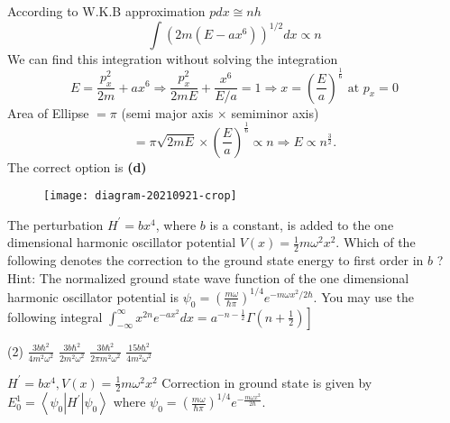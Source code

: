 \begin{enumerate}
\begin{answer}
\begin{minipage}{0.5\textwidth}
		According to W.K.B approximation $p d x \cong n h$
		$$
		\int\left(2 m\left(E-a x^{6}\right)\right)^{1 / 2} d x \propto n
		$$
		We can find this integration without solving the integration
		$$
		E=\frac{p_{x}^{2}}{2 m}+a x^{6} \Rightarrow \frac{p_{x}^{2}}{2 m E}+\frac{x^{6}}{E / a}=1 \Rightarrow x=\left(\frac{E}{a}\right)^{\frac{1}{6}} \text { at } p_{x}=0
		$$
		Area of Ellipse $=\pi$ (semi major axis $\times$ semiminor axis)
		$$
		=\pi \sqrt{2 m E} \times\left(\frac{E}{a}\right)^{\frac{1}{6}} \propto n \Rightarrow E \propto n^{\frac{3}{2}} .
		$$
		The correct option is \textbf{(d)}
	\end{minipage}
	\begin{minipage}{0.5\textwidth}
		\begin{figure}[H]
			\centering
			\texttt{[image: diagram-20210921-crop]}
		\end{figure}
	\end{minipage}
\end{answer}
\begin{minipage}{\textwidth}
	\item The perturbation $H^{\prime}=b x^{4}$, where $b$ is a constant, is added to the one dimensional harmonic oscillator potential $V(x)=\frac{1}{2} m \omega^{2} x^{2}$. Which of the following denotes the correction to the ground state energy to first order in $b$ ?
	Hint: The normalized ground state wave function of the one dimensional harmonic oscillator potential is $\psi_{0}=\left(\frac{m \omega}{\hbar \pi}\right)^{1 / 4} e^{-m \omega x^{2} / 2 \hbar} .$ You may use the following integral $\left.\int_{-\infty}^{\infty} x^{2 n} e^{-a x^{2}} d x=a^{-n-\frac{1}{2}} \Gamma\left(n+\frac{1}{2}\right)\right]$
\end{minipage}
\begin{tasks}(2)
	\task[\textbf{A.}] $\frac{3 b \hbar^{2}}{4 m^{2} \omega^{2}}$
	\task[\textbf{B.}]$\frac{3 b \hbar^{2}}{2 m^{2} \omega^{2}}$
	\task[\textbf{C.}]$\frac{3 b \hbar^{2}}{2 \pi m^{2} \omega^{2}}$
	\task[\textbf{D.}]$\frac{15 b \hbar^{2}}{4 m^{2} \omega^{2}}$
\end{tasks}
\begin{answer}
	$H^{\prime}=b x^{4}, V(x)=\frac{1}{2} m \omega^{2} x^{2}$
	Correction in ground state is given by $E_{0}^{1}=\left\langle\psi_{0}\left|H^{\prime}\right| \psi_{0}\right\rangle$ where $\psi_{0}=\left(\frac{m \omega}{\hbar \pi}\right)^{1 / 4} e^{-\frac{m \omega x^{2}}{2 \hbar}}$.\\
	$$\begin{aligned}

\end{aligned}$$
\end{answer}
\end{enumerate}
